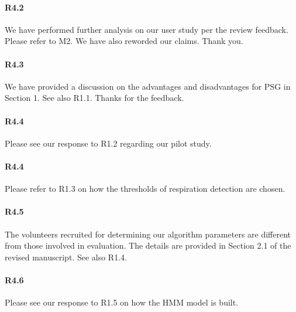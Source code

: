 \paragraph{R4.2} We have performed further analysis on our user study per the review feedback. Please refer to M2. We have also reworded our
claims. Thank you.


\paragraph{R4.3} We have provided a discussion on the advantages and disadvantages for PSG in Section 1. See also R1.1. Thanks for the feedback.

\paragraph{R4.4} Please see our response to R1.2 regarding our pilot study.

\paragraph{R4.4} Please refer to R1.3 on how the thresholds of respiration detection are chosen.

\paragraph{R4.5} The volunteers recruited for determining our algorithm parameters are different from those involved in
 evaluation. The details are provided in Section 2.1 of the revised manuscript. See also R1.4.

 \paragraph{R4.6} Please see our response to R1.5 on how the HMM model is built.
